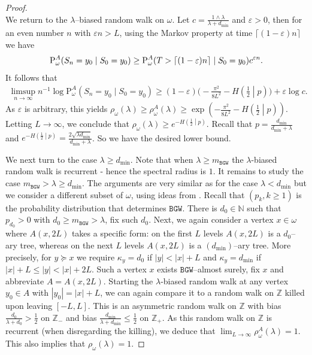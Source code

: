 \documentclass[11 pt]{article}
\theoremstyle{definition}
\numberwithin{equation}{section}
\newcommand{\ZZ}{\mathbb{Z}}
\newcommand{\Pws}{\mathrm{P}_{\omega}} %
\begin{document}
\begin{proof}
\begin{equation*}
	 \end{equation*}
	 We return to the $\lambda$--biased random walk on $\omega$.
	 Let $c = \frac{1\wedge \lambda}{\lambda +d_{\min}}$ and $\varepsilon>0$, then for an even number $n$ with $\varepsilon n>L$, using the Markov property at time $\lceil (1-\varepsilon)n \rceil$ we have 
	 \[
	 \Pws^{A}(S_n =y_0  \mid S_0 = y_0)\\ 
	 \ge \Pws^{A}(T > \lceil (1-\varepsilon)n \rceil  \mid S_0 = y_0) c^{ \varepsilon n}.
	 \]
	 It follows that 
	 \begin{align*}
	 	\limsup_{n\to \infty} n^{-1} \log \Pws^{A}(S_n =y_0  \mid S_0 = y_0) 
	 	\ge (1-\varepsilon) \bigg(-\frac{\pi^2}{8 L^2} - H\left( \frac{1}{2} \middle\vert p \right) \bigg) + \varepsilon \log c.
	 \end{align*}
 As $\varepsilon$ is arbitrary, this yields $\rho_{\omega}(\lambda)  \ge \rho^A_{\omega}(\lambda) \ge \exp( -\frac{\pi^2}{8L^2} - H\left( \frac{1}{2} \middle\vert p \right) )$. 
 Letting $L\to \infty$, we conclude that $\rho_{\omega}(\lambda)  \ge e^{- H\left( \frac{1}{2} \middle\vert p \right)}$. 
 Recall that $p = \frac{d_{\min}}{d_{\min}+\lambda}$ and  $e^{- H\left( \frac{1}{2} \middle\vert p \right)}=  \frac{2\sqrt{\lambda d_{\min}}}{d_{\min}+\lambda}$. So we have the desired lower bound. 
	
	We next turn to the case $\lambda \ge d_{\min}$. Note that when $\lambda \ge m_{\mathtt{BGW}}$ the $\lambda$-biased random walk is recurrent - hence the spectral radius is $1$. It remains to study the case $m_{\mathtt{BGW}}> \lambda \ge d_{\min}$. The arguments are very similar as for the case $\lambda < d_{\min}$ but we consider a different subset of $\omega$, using ideas from \cite[Proof of Theorem~1.2]{DGPZ-ld}. 
	Recall that $(p_k,k\geq 1)$ is the probability distribution that determines $\mathtt{BGW}$. 
	There is $d_0 \in \mathbb{N}$ such that $p_{d_0} > 0$ with $d_0 \geq m_{\mathtt{BGW}} >\lambda$, fix such $d_0$. 
	Next, we again consider a vertex $x\in \omega$ where $A(x,2L)$ takes a specific form: on the first $L$ levels $A(x,2L)$ is a $d_0$--ary tree, whereas on the next $L$ levels $A(x,2L)$ is a $(d_{\min})$--ary tree. More precisely, for $y\succeq x$ we require $\kappa_y=d_0$ if $\vert y \vert <\vert x \vert + L$ and $\kappa_y=d_{\min}$ if $\vert x\vert +L \leq \vert y \vert < \vert x \vert +2L$. Such a vertex $x$ exists $\mathtt{BGW}$--almost surely, fix $x$ and abbreviate $A= A(x,2L)$.
	Starting the $\lambda$-biased random walk at any vertex $y_0\in A$ with $|y_0|= |x|+L$, we can again compare it to a random walk on $\ZZ$ killed upon leaving $[-L, L]$. This is an asymmetric random walk on $\ZZ$ with bias $\frac{d_0}{\lambda + d_0}>\frac{1}{2}$ on $\ZZ_-$ and bias $\frac{d_{\min}}{\lambda + d_{\min}} \leq \frac{1}{2}$ on $\ZZ_+$. As this random walk on $\ZZ$ is recurrent (when disregarding the killing), we deduce that  
	 $\lim_{L\to \infty} \rho^A_{\omega}(\lambda) = 1$. This also implies that $\rho_\omega(\lambda) =1$. 
\end{proof}
\end{document}
